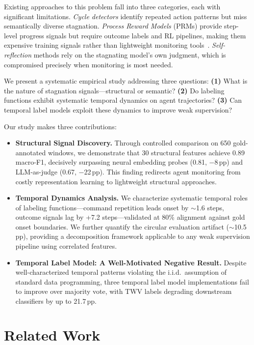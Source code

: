 \documentclass[11pt,a4paper]{article}
\begin{document}
Existing approaches to this problem fall into three categories, each with significant limitations.
\emph{Cycle detectors} identify repeated action patterns but miss semantically diverse stagnation.
\emph{Process Reward Models} (PRMs) provide step-level progress signals but require outcome labels and RL pipelines, making them expensive training signals rather than lightweight monitoring tools~\cite{xie2026agentprm}.
\emph{Self-reflection} methods rely on the stagnating model's own judgment, which is compromised precisely when monitoring is most needed.

We present a systematic empirical study addressing three questions:
\textbf{(1)} What is the nature of stagnation signals---structural or semantic?
\textbf{(2)} Do labeling functions exhibit systematic temporal dynamics on agent trajectories?
\textbf{(3)} Can temporal label models exploit these dynamics to improve weak supervision?

Our study makes three contributions:
\begin{itemize}
\item \textbf{Structural Signal Discovery.} Through controlled comparison on 650 gold-annotated windows, we demonstrate that 30 structural features achieve 0.89 macro-F1, decisively surpassing neural embedding probes (0.81, $-$8\,pp) and LLM-as-judge (0.67, $-$22\,pp). This finding redirects agent monitoring from costly representation learning to lightweight structural approaches.

\item \textbf{Temporal Dynamics Analysis.} We characterize systematic temporal roles of labeling functions---command repetition leads onset by $\sim$1.6 steps, outcome signals lag by +7.2 steps---validated at 80\% alignment against gold onset boundaries. We further quantify the circular evaluation artifact ($\sim$10.5\,pp), providing a decomposition framework applicable to any weak supervision pipeline using correlated features.

\item \textbf{Temporal Label Model: A Well-Motivated Negative Result.} Despite well-characterized temporal patterns violating the i.i.d.\ assumption of standard data programming, three temporal label model implementations fail to improve over majority vote, with TWV labels degrading downstream classifiers by up to 21.7\,pp.
\end{itemize}

\section{Related Work}
\end{document}
